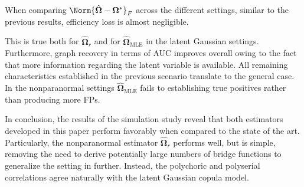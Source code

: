 When comparing $\Norm{\hat{\boldsymbol\Omega} - \boldsymbol\Omega^*}_F$ across the different settings, similar to the previous results, efficiency loss is almost negligible.

\noindent This is true both for $\hat{\boldsymbol\Omega}_r$ and for $\hat{\boldsymbol\Omega}_{\text{MLE}}$ in the latent Gaussian settings. Furthermore, graph recovery in terms of AUC improves overall owing to the fact that more information regarding the latent variable is available.
All remaining characteristics established in the previous scenario translate to the general case. In the nonparanormal settings $\hat{\boldsymbol\Omega}_{\text{MLE}}$ fails to establishing true positives rather than producing more FPs. 

In conclusion, the results of the simulation study reveal that both estimators developed in this paper perform favorably when compared to the state of the art. Particularly, the nonparanormal estimator $\hat{\boldsymbol\Omega}_r$ 
performs well, but is simple, removing the need to derive potentially large numbers of bridge functions to generalize the setting in \citet{Fan17} further. Instead, the polychoric and polyserial correlations agree naturally with the latent Gaussian copula model. 